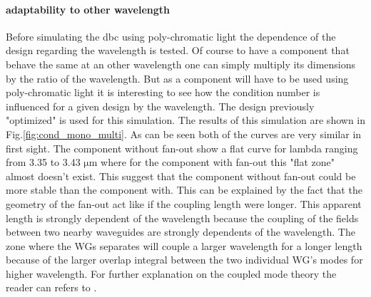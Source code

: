 \paragraph{adaptability to other wavelength}
Before simulating the \gls{dbc} using poly-chromatic light the dependence of the design regarding the wavelength is tested. Of course to have a component that behave the same at an other wavelength one can simply multiply its dimensions by the ratio of the wavelength. But as a component will have to be used using poly-chromatic light it is interesting to see how the condition number is influenced for a given design by the wavelength. The design previously "optimized" is used for this simulation. The results of this simulation are shown in Fig.\ref{fig:cond_mono_multi}. As can be seen both of the curves are very similar in first sight. The component without fan-out show a flat curve for lambda ranging from 3.35 to 3.43 $\si{\micro\meter}$ where for the component with fan-out this "flat zone" almost doesn't exist. This suggest that the component without fan-out could be more stable than the component with. This can be explained by the fact that the geometry of the fan-out act like if the coupling length were longer. This apparent length is strongly dependent of the wavelength because the coupling of the fields between two nearby waveguides are strongly dependents of the wavelength. The zone where the WGs separates will couple a larger wavelength for a longer length because of the larger overlap integral between the two  individual WG's modes for higher wavelength. For further explanation on the coupled mode theory the reader can refers to \cite{saleh_teich, marcuse}.


